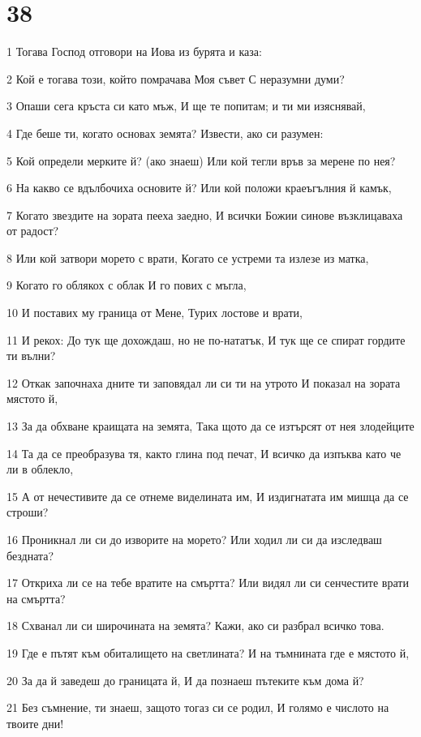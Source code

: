 \chapter{38}

\par 1 Тогава Господ отговори на Иова из бурята и каза:
\par 2 Кой е тогава този, който помрачава Моя съвет С неразумни думи?
\par 3 Опаши сега кръста си като мъж, И ще те попитам; и ти ми изяснявай,
\par 4 Где беше ти, когато основах земята? Извести, ако си разумен:
\par 5 Кой определи мерките й? (ако знаеш) Или кой тегли връв за мерене по нея?
\par 6 На какво се вдълбочиха основите й? Или кой положи краеъгълния й камък,
\par 7 Когато звездите на зората пееха заедно, И всички Божии синове възклицаваха от радост?
\par 8 Или кой затвори морето с врати, Когато се устреми та излезе из матка,
\par 9 Когато го облякох с облак И го пових с мъгла,
\par 10 И поставих му граница от Мене, Турих лостове и врати,
\par 11 И рекох: До тук ще дохождаш, но не по-нататък, И тук ще се спират гордите ти вълни?
\par 12 Откак започнаха дните ти заповядал ли си ти на утрото И показал на зората мястото й,
\par 13 За да обхване краищата на земята, Така щото да се изтърсят от нея злодейците
\par 14 Та да се преобразува тя, както глина под печат, И всичко да изпъква като че ли в облекло,
\par 15 А от нечестивите да се отнеме виделината им, И издигнатата им мишца да се строши?
\par 16 Проникнал ли си до изворите на морето? Или ходил ли си да изследваш бездната?
\par 17 Откриха ли се на тебе вратите на смъртта? Или видял ли си сенчестите врати на смъртта?
\par 18 Схванал ли си широчината на земята? Кажи, ако си разбрал всичко това.
\par 19 Где е пътят към обиталището на светлината? И на тъмнината где е мястото й,
\par 20 За да й заведеш до границата й, И да познаеш пътеките към дома й?
\par 21 Без съмнение, ти знаеш, защото тогаз си се родил, И голямо е числото на твоите дни!
